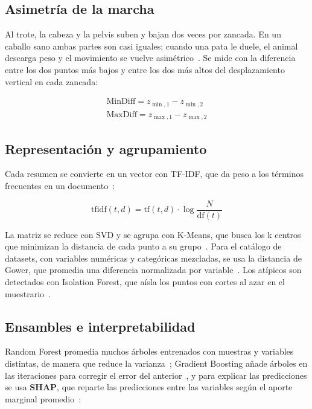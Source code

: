 \documentclass[conference,a4paper]{IEEEtran}
\begin{document}
\subsection{Asimetría de la marcha}

Al trote, la cabeza y la pelvis suben y bajan dos veces por zancada. En un caballo sano ambas partes son casi iguales; cuando una pata le duele, el animal descarga peso y el movimiento se vuelve asimétrico~\cite{keegan2013}. Se mide con la diferencia entre los dos puntos más bajos y entre los dos más altos del desplazamiento vertical en cada zancada:

\begin{gather*}
\mathrm{MinDiff} = z_{\min,1} - z_{\min,2} \\
\mathrm{MaxDiff} = z_{\max,1} - z_{\max,2}
\end{gather*}

\subsection{Representación y agrupamiento}

Cada resumen se convierte en un vector con TF-IDF, que da peso a los términos frecuentes en un documento~\cite{salton1988}:

\[
\mathrm{tfidf}(t,d) = \mathrm{tf}(t,d)\cdot \log\frac{N}{\mathrm{df}(t)}
\]

La matriz se reduce con SVD y se agrupa con K-Means, que busca los k centros que minimizan la distancia de cada punto a su grupo~\cite{lloyd1982}. Para el catálogo de datasets, con variables numéricas y categóricas mezcladas, se usa la distancia de Gower, que promedia una diferencia normalizada por variable~\cite{gower1971}. Los atípicos son detectados con Isolation Forest, que aísla los puntos con cortes al azar en el muestrario~\cite{liu2008}.

\subsection{Ensambles e interpretabilidad}

Random Forest promedia muchos árboles entrenados con muestras y variables distintas, de manera que reduce la varianza~\cite{breiman2001}; Gradient Boosting añade árboles en las iteraciones para corregir el error del anterior~\cite{friedman2001}, y para explicar las predicciones se usa \textbf{SHAP}, que reparte las predicciones entre las variables según el aporte marginal promedio~\cite{lundberg2017}:
\end{document}

